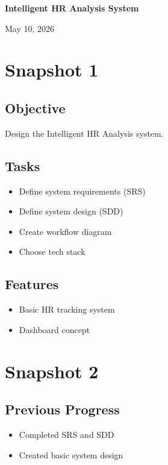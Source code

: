 \documentclass[12pt]{article}
\begin{document}
\begin{titlepage}
    \centering
    \vfill
    {\Huge\bfseries Intelligent HR Analysis System\par}
    {\large May 10, 2026\par}
    \vfill
\end{titlepage}

\section{Snapshot 1}

\subsection{Objective}
Design the Intelligent HR Analysis system.

\subsection{Tasks}
\begin{itemize}
    \item Define system requirements (SRS)
    \item Define system design (SDD)
    \item Create workflow diagram
    \item Choose tech stack
\end{itemize}

\subsection{Features}
\begin{itemize}
    \item Basic HR tracking system
    \item Dashboard concept
\end{itemize}

\section{Snapshot 2}

\subsection{Previous Progress}
\begin{itemize}
    \item Completed SRS and SDD
    \item Created basic system design
\end{itemize}
\end{document}
